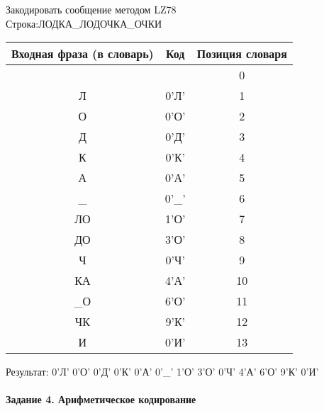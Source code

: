 \documentclass[a4paper, 12pt]{article}
\begin{document}
Закодировать сообщение методом LZ78\\
Строка:ЛОДКА\_ЛОДОЧКА\_ОЧКИ\\
\begin{table}[h!]
\centering
\begin{tabular}{|c|c|c|} 
\hline
 Входная фраза (в словарь) & Код & Позиция словаря \\ \hline

 &  & 0 \\ \hline
Л & 0'Л' & 1 \\ \hline
О & 0'О' & 2 \\ \hline
Д & 0'Д' & 3 \\ \hline
К & 0'К' & 4 \\ \hline
А & 0'А' & 5 \\ \hline
\_ & 0'\_' & 6 \\ \hline
ЛО & 1'О' & 7 \\ \hline
ДО & 3'О' & 8 \\ \hline
Ч & 0'Ч' & 9 \\ \hline
КА & 4'А' & 10 \\ \hline
\_О & 6'О' & 11 \\ \hline
ЧК & 9'К' & 12 \\ \hline
И & 0'И' & 13 \\ \hline
\end{tabular}
\end{table}

Результат: 0'Л' 0'О' 0'Д' 0'К' 0'А' 0'\_' 1'О' 3'О' 0'Ч' 4'А' 6'О' 9'К' 0'И'\\
\pagebreak
\paragraph{Задание 4. Арифметическое кодирование\\}
\end{document}
